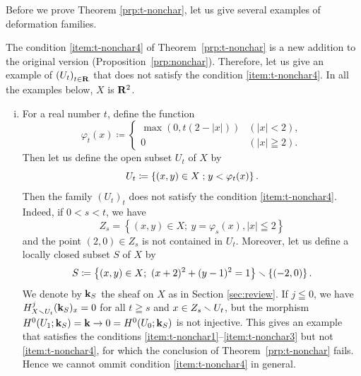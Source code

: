 Before we prove Theorem \ref{prp:t-nonchar}, 
let us give several examples of deformation families. 

\begin{Example+}\label{eg:t-nonchar}
  The condition \eqref{item:t-nonchar4} of 
  Theorem~\ref{prp:t-nonchar} is a new addition to
  the original version (Proposition~\ref{prp:nonchar}). 
  Therefore, let us give an example of \(\left(U_{t}\right)_{t\in\mathbf{R}}\) 
  that does not satisfy the condition \eqref{item:t-nonchar4}. 
  In all the examples below, \(X\) is \(\mathbf{R}^{2}\).
  \begin{enumerate}[(i)]
    \item \label{item:not-gentle} 
    For a real number \(t\), define the 
    function\[
      \varphi_{t}(x)\coloneqq\begin{cases}
        \max\left(0,t(2-\left|x\right|)\right)&(\left|x\right| < 2),\\
        0& (\left|x\right|\geqq 2).
      \end{cases}
    \]
    Then let us define the open subset \(U_t\)
    of \(X\) by
    \[
      U_{t}\coloneqq
      \left\{
        (x,y)\in X\mathrel{;} y<\varphi_{t}(x)
      \right\}. 
    \]
    Then the family \((U_{t})_{t}\) does not satisfy 
    the condition \eqref{item:t-nonchar4}. 
    Indeed, if \(0<s<t\), 
    we have 
    \[
      Z_{s}=\left\{
        (x,y)\in X;\ y=\varphi_{s}(x), \left|x\right|\leqq 2
      \right\}
    \] and the point \((2,0)\in Z_{s}\) is 
    not contained in \(U_{t}\). 
    Moreover, let us define 
    a locally closed subset \(S\) of \(X\) by
    \[
      S\coloneqq 
      \left\{(x,y)\in X;\ (x+2)^{2}+(y-1)^{2}=1\right\}
      \smallsetminus 
      \left\{(-2,0)\right\}. 
    \]
    We denote by \(\mathbf{k}_{S}\) 
    the sheaf on \(X\) as in Section \ref{sec:review}. 
    If \(j\leqq0\), we have \(
      H^{j}_{X\smallsetminus U_{t}}(\mathbf{k}_{S})_{x}=0
    \) for all \(t \geqq s\) and \(x\in Z_{s}\smallsetminus U_{t}\), 
    but the morphism \(
      H^{0}(U_{1};\mathbf{k}_{S})=\mathbf{k}
      \to 
      0 = H^{0}(U_{0};\mathbf{k}_{S})
    \) is not injective. 
    This gives an example that 
    satisfies the conditions 
    \eqref{item:t-nonchar1}--\eqref{item:t-nonchar3} but 
    not \eqref{item:t-nonchar4}, 
    for which 
    the conclusion of Theorem~\ref{prp:t-nonchar} fails. 
    Hence 
    we cannot ommit condition \eqref{item:t-nonchar4} %
    in general.
    \begin{figure}[htb]
      \centering
\end{figure}
\end{enumerate}
\end{Example+}

